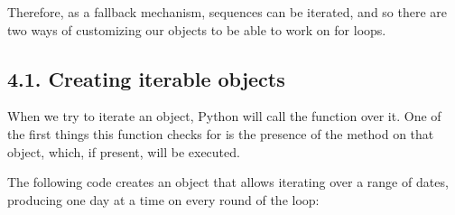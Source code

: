 \documentclass[a4paper,10pt,english]{sphinxmanual}
\begin{document}
Therefore, as a fallback mechanism, sequences can be iterated, and so there are two ways of customizing our objects to
be able to work on for loops.


\subsection{4.1. Creating iterable objects}
\label{\detokenize{chapters/2_pythonic_code/index:creating-iterable-objects}}
When we try to iterate an object, Python will call the  function over it. One of the first things this
function checks for is the presence of the  method on that object, which, if present, will be executed.

The following code creates an object that allows iterating over a range of dates, producing one day at a time on every
round of the loop:

\begin{sphinxVerbatim}[commandchars=\\\{\}]
   

 
       
          
          
          

  
     

  
       
         

      
      
     
\end{sphinxVerbatim}
\end{document}
